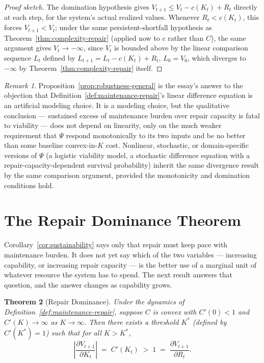 \documentclass[12pt,a4paper]{article}
\theoremstyle{plain}
\newtheorem{theorem}{Theorem}[section]
\theoremstyle{definition}
\theoremstyle{remark}
\newtheorem{remark}[theorem]{Remark}
\begin{document}
\begin{proof}[Proof sketch]
The domination hypothesis gives $V_{t+1} \le V_t - c(K_t) + R_t$ directly at each step, for the system's actual realized values. Whenever $R_t < c(K_t)$, this forces $V_{t+1} < V_t$; under the same persistent-shortfall hypothesis as Theorem~\ref{thm:complexity-repair} (applied now to $c$ rather than $C$), the same argument gives $V_t \to -\infty$, since $V_t$ is bounded above by the linear comparison sequence $L_t$ defined by $L_{t+1}=L_t - c(K_t) + R_t$, $L_0 = V_0$, which diverges to $-\infty$ by Theorem~\ref{thm:complexity-repair} itself.
\end{proof}

\begin{remark}
Proposition~\ref{prop:robustness-general} is the essay's answer to the objection that Definition~\ref{def:maintenance-repair}'s linear difference equation is an artificial modeling choice. It is a modeling choice, but the qualitative conclusion — sustained excess of maintenance burden over repair capacity is fatal to viability — does not depend on linearity, only on the much weaker requirement that $\Psi$ respond monotonically to its two inputs and be no better than some baseline convex-in-$K$ cost. Nonlinear, stochastic, or domain-specific versions of $\Psi$ (a logistic viability model, a stochastic difference equation with a repair-capacity-dependent survival probability) inherit the same divergence result by the same comparison argument, provided the monotonicity and domination conditions hold.
\end{remark}

\section{The Repair Dominance Theorem}
\label{sec:repair-dominance}

Corollary~\ref{cor:sustainability} says only that repair must keep pace with maintenance burden. It does not yet say which of the two variables — increasing capability, or increasing repair capacity — is the better use of a marginal unit of whatever resource the system has to spend. The next result answers that question, and the answer changes as capability grows.

\begin{theorem}[Repair Dominance]
\label{thm:repair-dominance}
Under the dynamics of Definition~\ref{def:maintenance-repair}, suppose $C$ is convex with $C'(0) < 1$ and $C'(K) \to \infty$ as $K \to \infty$. Then there exists a threshold $K^\ast$ (defined by $C'(K^\ast) = 1$) such that for all $K > K^\ast$,
\[
\left| \frac{\partial V_{t+1}}{\partial K_t} \right| \;=\; C'(K_t) \;>\; 1 \;=\; \frac{\partial V_{t+1}}{\partial R_t}.
\]
\end{theorem}
\end{document}
